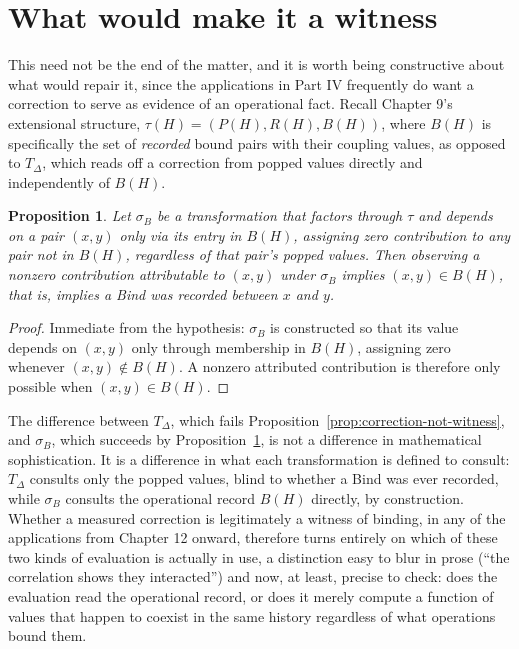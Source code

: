 \documentclass[11pt]{book}
\newtheorem{proposition}[theorem]{Proposition}
\begin{document}
\section{What would make it a witness}

This need not be the end of the matter, and it is worth being constructive about what would repair it, since the applications in Part IV frequently do want a correction to serve as evidence of an operational fact. Recall Chapter 9's extensional structure, $\tau(H)=(P(H),R(H),B(H))$, where $B(H)$ is specifically the set of \emph{recorded} bound pairs with their coupling values, as opposed to $T_\Delta$, which reads off a correction from popped values directly and independently of $B(H)$.

\begin{proposition}
\label{prop:witness-when-reading-B}
Let $\sigma_B$ be a transformation that factors through $\tau$ and depends on a pair $(x,y)$ only via its entry in $B(H)$, assigning zero contribution to any pair not in $B(H)$, regardless of that pair's popped values. Then observing a nonzero contribution attributable to $(x,y)$ under $\sigma_B$ implies $(x,y)\in B(H)$, that is, implies a Bind was recorded between $x$ and $y$.
\end{proposition}
\begin{proof}
Immediate from the hypothesis: $\sigma_B$ is constructed so that its value depends on $(x,y)$ only through membership in $B(H)$, assigning zero whenever $(x,y)\notin B(H)$. A nonzero attributed contribution is therefore only possible when $(x,y)\in B(H)$.
\end{proof}

The difference between $T_\Delta$, which fails Proposition~\ref{prop:correction-not-witness}, and $\sigma_B$, which succeeds by Proposition~\ref{prop:witness-when-reading-B}, is not a difference in mathematical sophistication. It is a difference in what each transformation is defined to consult: $T_\Delta$ consults only the popped values, blind to whether a Bind was ever recorded, while $\sigma_B$ consults the operational record $B(H)$ directly, by construction. Whether a measured correction is legitimately a witness of binding, in any of the applications from Chapter 12 onward, therefore turns entirely on which of these two kinds of evaluation is actually in use, a distinction easy to blur in prose (``the correlation shows they interacted'') and now, at least, precise to check: does the evaluation read the operational record, or does it merely compute a function of values that happen to coexist in the same history regardless of what operations bound them.
\end{document}
